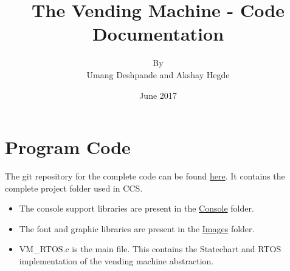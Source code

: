 \documentclass{article}
\title{The Vending Machine - Code Documentation}
\author{By \\ Umang Deshpande and Akshay Hegde}
\date{June 2017}
\begin{document}
\maketitle

\section{Program Code}
\qquad The git repository for the complete code can be found \href{https://github.com/eYSIP-2017/eYSIP-2017_Game_Development-TI-RTOS/tree/master/VendingMachine_Final}{here}. It contains the complete project folder used in CCS. 
\begin{itemize}
  \item The console support libraries are present in the \href{https://github.com/eYSIP-2017/eYSIP-2017_Game_Development-TI-RTOS/tree/master/VendingMachine_Final/Console}{Console} folder. 
  \item The font and graphic libraries are present in the \href{https://github.com/eYSIP-2017/eYSIP-2017_Game_Development-TI-RTOS/tree/master/VendingMachine_Final/Images}{Images} folder.
  \item VM\_RTOS.c is the main file. This contains the Statechart and RTOS implementation of the vending machine abstraction.
\end{itemize}
\end{document}
